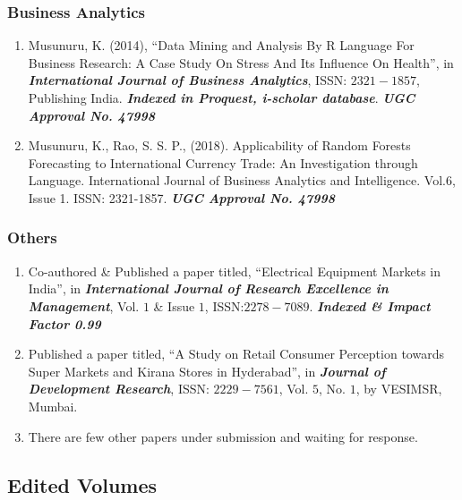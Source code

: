 \documentclass[10pt]{article}
\begin{document}
\subsubsection{Business Analytics}

\begin{enumerate}

\item Musunuru, K. (2014), \enquote{Data Mining and Analysis By R Language For Business Research: A Case Study On Stress And Its Influence On Health}, in \textit{\textbf{International Journal of Business Analytics}}, ISSN: $2321-1857$, Publishing India. \emph{\textbf{Indexed in Proquest, i-scholar database}}. \emph{\textbf{UGC Approval No. 47998}}


\item Musunuru, K., Rao, S. S. P., (2018). Applicability of Random Forests Forecasting to International Currency Trade: An Investigation through Language. International Journal of Business Analytics and Intelligence. Vol.6, Issue 1. ISSN: 2321-1857. \emph{\textbf{UGC Approval No. 47998}}

\end{enumerate}

\subsubsection{Others}

\begin{enumerate}

\item Co-authored \& Published a paper titled, \enquote{Electrical Equipment Markets in India}, in  \textit{\textbf{International Journal of Research Excellence in Management}}, Vol. $1$ \& Issue $1$, ISSN:$2278-7089$. \emph{\textbf{Indexed \& Impact Factor 0.99}}

\item Published a paper titled, \enquote{A Study on Retail Consumer Perception towards Super Markets and Kirana Stores in Hyderabad}, in \textit{\textbf{Journal  of  Development  Research}},  ISSN: $2229-7561$, Vol. $5$,  No. $1$,  by VESIMSR, Mumbai.  

\item There are few other papers under submission and waiting for response. 

\end{enumerate}

\subsection{Edited Volumes}
\end{document}
